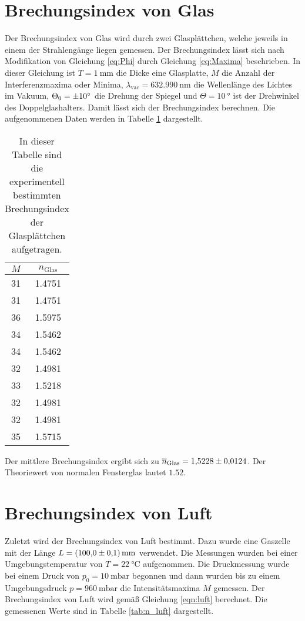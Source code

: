 \section{Brechungsindex von Glas}
\label{sec:n_glas}
Der Brechungsindex von Glas wird durch zwei Glasplättchen, welche jeweils in einem der Strahlengänge liegen gemessen. Der Brechungsindex lässt sich nach Modifikation von Gleichung 
\ref{eq:Phi} durch Gleichung \ref{eq:Maxima} beschrieben. In dieser Gleichung ist $T = \qty{1}{\milli\metre}$ die Dicke eine Glasplatte, $M$ die Anzahl der Interferenzmaxima oder 
Minima, $\lambda_\mathrm{vac} = \qty{632.990}{\nano\metre}$ die Wellenlänge des Lichtes im Vakuum, $\Theta_0 = \qty{\pm 10}{\degree}$ die Drehung der Spiegel und 
$\Theta = \qty{10}{\degree}$ ist der Drehwinkel des Doppelglashalters. Damit lässt sich der Brechungsindex berechnen. Die aufgenommenen Daten werden in Tabelle \ref{tab:n_glas} 
dargestellt.

\begin{table}[htbp] 
  \centering 
  \begin{tabular}{c c} 
      \toprule $M$ & $n_\mathrm{Glas}$\\ 
      \midrule 
      31 & 1.4751 \\
      31 & 1.4751 \\
      36 & 1.5975 \\
      34 & 1.5462 \\
      34 & 1.5462 \\
      32 & 1.4981 \\
      33 & 1.5218 \\
      32 & 1.4981 \\
      32 & 1.4981 \\
      35 & 1.5715 \\

      \bottomrule 
  \end{tabular} 
  \caption[Tabelle]{In dieser Tabelle sind die experimentell bestimmten Brechungsindex der Glasplättchen aufgetragen.} 
  \label{tab:n_glas} 
\end{table}

Der mittlere Brechungsindex ergibt sich zu $\overline{n}_\mathrm{Glas} = \num{1.5228 \pm 0.0124}$. Der Theoriewert von normalen Fensterglas lautet $\num{1.52}$\cite{phy-chem-eigenschaften}.

\section{Brechungsindex von Luft}
\label{sec:n_luft}
Zuletzt wird der Brechungsindex von Luft bestimmt. Dazu wurde eine Gaszelle mit der Länge $L = \qty{100 \pm 0.1}{\milli\metre}$ verwendet. Die Messungen wurden bei einer Umgebungstemperatur 
von $T = \qty{22}{\celsius}$ aufgenommen. Die Druckmessung wurde bei einem Druck von 
$p_0 = \qty{10}{\milli\bar}$ begonnen und dann wurden bis zu einem Umgebungsdruck $p = \qty{960}{\milli\bar}$ die Intensitätsmaxima $M$ gemessen. Der Brechungsindex von Luft wird gemäß 
Gleichung \ref{eqn:luft} berechnet. Die gemessenen Werte sind in Tabelle \ref{tab:n_luft} dargestellt.


